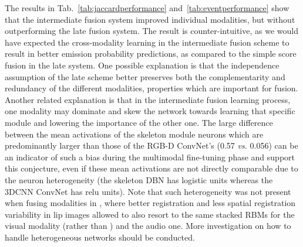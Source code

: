 \label{LateIntermediateFusion}
%
The results in Tab.~\ref{tab:jaccardperformance} and~\ref{tab:eventperformance} show that the intermediate fusion system
improved individual modalities, but without outperforming the late fusion system.
%
The result is counter-intuitive, as we would have expected the cross-modality learning in the intermediate fusion scheme
to result in better emission probability predictions, as compared to the simple score fusion in the late system.
%
One possible explanation is that the independence assumption of the late scheme better preserves both
the complementarity and redundancy of the different modalities, properties which are important for fusion.
%
Another related explanation is that in the intermediate fusion learning process,
one modality may dominate and  skew the network towards  learning that specific module and
lowering the importance of the other one.
%
The large difference between the mean activations of the  skeleton module neurons which are predominantly larger than those of the
RGB-D ConvNet's (0.57 \emph{vs.} 0.056) can be an indicator of such a bias during the multimodal fine-tuning phase and
support this conjecture, even if these mean activations are not directly comparable
due to the neuron heterogeneity (the skeleton DBN has logistic units whereas the 3DCNN ConvNet has relu units).
%
Note that such heterogeneity was not present when fusing modalities  in \cite{Ngiam2011multimodal},
where better registration and less spatial registration variability in lip images
allowed to also resort to the same stacked RBMs for the visual modality (rather than \ThreeDCNN)  and the audio one.
%
More investigation on how to handle heterogeneous networks  should be conducted.



%

